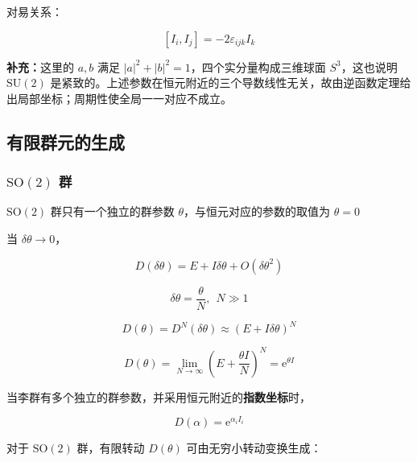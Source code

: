 对易关系：

\begin{equation}
\left[I_i,I_j\right]
=-2\varepsilon_{ijk} I_k
\end{equation}

\textbf{补充：}这里的 $a,b$ 满足 $|a|^2+|b|^2=1$，四个实分量构成三维球面 $S^3$，这也说明 $\mathrm{SU}\left(2\right)$ 是紧致的。上述参数在恒元附近的三个导数线性无关，故由逆函数定理给出局部坐标；周期性使全局一一对应不成立。

\subsection{有限群元的生成}

\subsubsection*{\texorpdfstring{$\mathrm{SO}\left(2\right)$ 群}{SO(2) 群}}

$\mathrm{SO}\left(2\right)$ 群只有一个独立的群参数 $\theta$，与恒元对应的参数的取值为 $\theta=0$

当 $\delta\theta\to 0$，

\begin{equation}
D\left(\delta \theta\right)
=E + I \delta \theta+O\left(\delta\theta^2\right)
\end{equation}

\begin{equation}
\delta \theta
=\frac{\theta }{N },~~N\gg 1
\end{equation}

\begin{equation}
D\left(\theta\right)
=D^N\left(\delta\theta\right)
\approx \left(E + I \delta \theta\right)^N
\end{equation}

\begin{equation}
D\left(\theta\right)
=\lim_{N\to \infty} \left(E + \frac{\theta I }{N }  \right)^{N}
=\mathrm{e}^{\theta I}
\end{equation}

当李群有多个独立的群参数，并采用恒元附近的\textbf{指数坐标}时，

\begin{equation}
D\left(\alpha\right) = \mathrm{e}^{\alpha_i I_i}
\end{equation}

对于 $\mathrm{SO}\left(2\right)$ 群，有限转动 $D\left(\theta\right)$ 可由无穷小转动变换生成：

